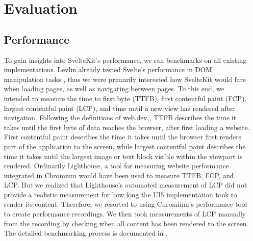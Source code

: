 \chapter{Evaluation}
\label{ch:evaluation}

\section{Performance}
\label{sec:evaluation-performance}

To gain insights into SvelteKit's performance, we ran benchmarks on all existing implementations. Levlin already tested Svelte's performance in DOM manipulation tasks \cite{levlin_dom_2020}, thus we were primarily interested how SvelteKit would fare when loading pages, as well as navigating between pages. To this end, we intended to measure the time to first byte (TTFB), first contentful paint (FCP), largest contentful paint (LCP), and time until a new view has rendered after navigation. Following the definitions of web.dev \cite{noauthor_webdev_nodate}, TTFB describes the time it takes until the first byte of data reaches the browser, after first loading a website. First contentful paint describes the time it takes until the browser first renders part of the application to the screen, while largest contentful paint describes the time it takes until the largest image or text block visible within the viewport is rendered. Ordinarily Lighthouse, a tool for measuring website performance integrated in Chromium would have been used to measure TTFB, FCP, and LCP. But we realized that Lighthouse's automated measurement of LCP did not provide a realistic measurement for how long the UI5 implementation took to render its content. Therefore, we resorted to using Chromium's performance tool to create performance recordings. We then took measurements of LCP manually from the recording by checking when all content has been rendered to the screen. The detailed benchmarking process is documented in .  


